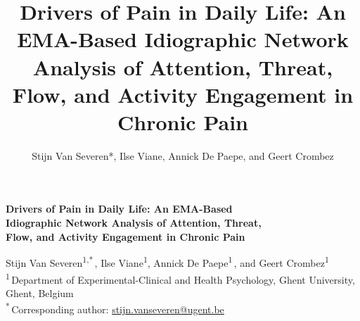 \documentclass[11pt,a4paper]{article}
\title{Drivers of Pain in Daily Life: An EMA-Based Idiographic Network Analysis of Attention, Threat, Flow, and Activity Engagement in Chronic Pain}
\author{Stijn Van Severen*, Ilse Viane, Annick De Paepe, and Geert Crombez}
\date{}
\begin{document}
\begin{titlepage}
\thispagestyle{fancy}
\vspace*{\fill}
\begin{center}
{\fontsize{18.2}{22.8}\selectfont\textbf{Drivers of Pain in Daily Life: An EMA-Based\\
Idiographic Network Analysis of Attention, Threat,\\
Flow, and Activity Engagement in Chronic Pain}\par}
\vspace{1.2em}
\normalsize
Stijn Van Severen\textsuperscript{1,*}\,,
Ilse Viane\textsuperscript{1},
Annick De Paepe\textsuperscript{1}\,, and
Geert Crombez\textsuperscript{1}\,\\[0.6em]
\footnotesize
\textsuperscript{1}\,Department of Experimental-Clinical and Health Psychology,
Ghent University, Ghent, Belgium\\
\textsuperscript{*}\,Corresponding author: \href{mailto:stijn.vanseveren@ugent.be}{stijn.vanseveren@ugent.be}
\end{center}
\vspace{0.8em}


\end{titlepage}
\end{document}
